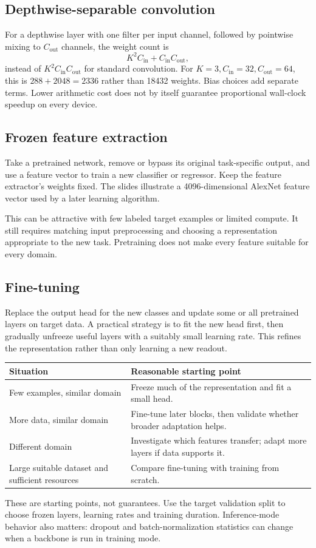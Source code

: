 \documentclass[11pt]{article}
\begin{document}
\subsection{Depthwise-separable convolution}
For a depthwise layer with one filter per input channel, followed by pointwise mixing to $C_{\mathrm{out}}$ channels, the weight count is
\[
K^2C_{\mathrm{in}}+C_{\mathrm{in}}C_{\mathrm{out}},
\]
instead of $K^2C_{\mathrm{in}}C_{\mathrm{out}}$ for standard convolution. For $K=3,C_{\mathrm{in}}=32,C_{\mathrm{out}}=64$, this is $288+2048=2336$ rather than 18432 weights. Bias choices add separate terms. Lower arithmetic cost does not by itself guarantee proportional wall-clock speedup on every device.

\subsection{Frozen feature extraction}
Take a pretrained network, remove or bypass its original task-specific output, and use a feature vector to train a new classifier or regressor. Keep the feature extractor's weights fixed. The slides illustrate a 4096-dimensional AlexNet feature vector used by a later learning algorithm.

This can be attractive with few labeled target examples or limited compute. It still requires matching input preprocessing and choosing a representation appropriate to the new task. Pretraining does not make every feature suitable for every domain.
\subsection{Fine-tuning}
Replace the output head for the new classes and update some or all pretrained layers on target data. A practical strategy is to fit the new head first, then gradually unfreeze useful layers with a suitably small learning rate. This refines the representation rather than only learning a new readout.
\begin{longtable}{@{}P{.30\textwidth}P{.61\textwidth}@{}}
\toprule Situation & Reasonable starting point\\\midrule\endhead
Few examples, similar domain & Freeze much of the representation and fit a small head.\\
More data, similar domain & Fine-tune later blocks, then validate whether broader adaptation helps.\\
Different domain & Investigate which features transfer; adapt more layers if data supports it.\\
Large suitable dataset and sufficient resources & Compare fine-tuning with training from scratch.\\\bottomrule
\end{longtable}
These are starting points, not guarantees. Use the target validation split to choose frozen layers, learning rates and training duration. Inference-mode behavior also matters: dropout and batch-normalization statistics can change when a backbone is run in training mode.
\end{document}
